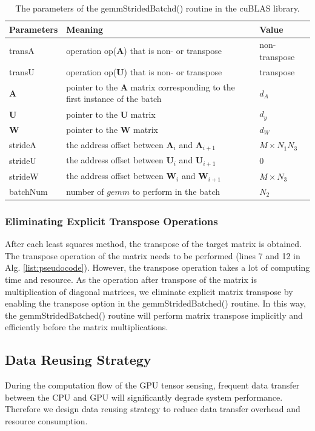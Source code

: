 \documentclass[futureinternet,article,submit,moreauthors,pdftex,10pt,a4paper]{Definitions/mdpi}
\theoremstyle{plain}
\theoremstyle{definition}
\theoremstyle{remark}
\begin{document}
\begin{table}
\caption{The parameters of the gemmStridedBatchd() routine in the cuBLAS library.}
\label{tab:gemm}
\begin{tabular}{|l|l|l|}
\hline
Parameters & Meaning & Value \\
\hline
transA & operation op($\mathbf{A}$) that is non- or transpose & non-transpose \\
\hline
transU & operation op($\mathbf{U}$) that is non- or transpose & transpose \\
\hline
$\mathbf{A}$ & pointer to the $\mathbf{A}$ matrix corresponding to the first instance of the batch & $d_A$ \\
\hline
$\mathbf{U}$ & pointer to the $\mathbf{U}$ matrix & $d_y$ \\
\hline
$\mathbf{W}$ & pointer to the $\mathbf{W}$ matrix & $d_W$ \\
\hline
strideA & the address offset between $\mathbf{A}_i$ and $\mathbf{A}_{i+1}$ & $M\times N_1N_3$ \\
\hline
strideU & the address offset between $\mathbf{U}_i$ and $\mathbf{U}_{i+1}$ & 0 \\
\hline
strideW & the address offset between $\mathbf{W}_i$ and $\mathbf{W}_{i+1}$ & $M\times N_3$ \\
\hline
batchNum & number of $gemm$ to perform in the batch & $N_2$ \\
\hline
\end{tabular}
\end{table}

\subsubsection{Eliminating Explicit Transpose Operations}
After each least squares method, the transpose of the target matrix is obtained. The transpose operation of the matrix needs to be performed (lines 7 and 12 in Alg. \ref{list:pseudocode}). However, the transpose operation takes a lot of computing time and resource. As the operation after transpose of the matrix is multiplication of diagonal matrices, we eliminate explicit matrix transpose by enabling the transpose option in the gemmStridedBatched() routine. In this way, the gemmStridedBatched() routine will perform matrix transpose implicitly and efficiently before the matrix multiplications. 

\subsection{Data Reusing Strategy}
During the computation flow of the GPU tensor sensing, frequent data transfer between the CPU and GPU will significantly degrade system performance. Therefore we design data reusing  strategy to reduce data transfer overhead and resource consumption.
\end{document}

